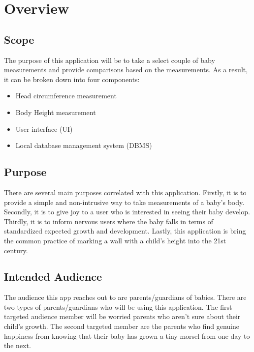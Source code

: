 \documentclass[onecolumn, draftclsnofoot,10pt, compsoc]{IEEEtran}
\begin{document}
\section{Overview}
\subsection{Scope}
The purpose of this application will be to take a select couple of baby measurements and provide comparisons based on the measurements.
As a result, it can be broken down into four components:

\begin{itemize}
    \item Head circumference measurement
    \item Body Height measurement
    \item User interface (UI)
    \item Local database management system (DBMS)
\end{itemize}


\subsection{Purpose}

There are several main purposes correlated with this application. Firstly, it is to provide a simple and non-intrusive way to take measurements of a baby's body. Secondly, it is to give joy to a user who is interested in seeing their baby develop. Thirdly, it is to inform nervous users where the baby falls in terms of standardized expected growth and development. Lastly, this application is bring the common practice of marking a wall with a child's height into the 21st century.

\subsection{Intended Audience}

The audience this app reaches out to are parents/guardians of babies. There are two types of parents/guardians who will be using this application. The first targeted audience member will be worried parents who aren't sure about their child's growth. The second targeted member are the parents who find genuine happiness from knowing that their baby has grown a tiny morsel from one day to the next. \\
\end{document}
